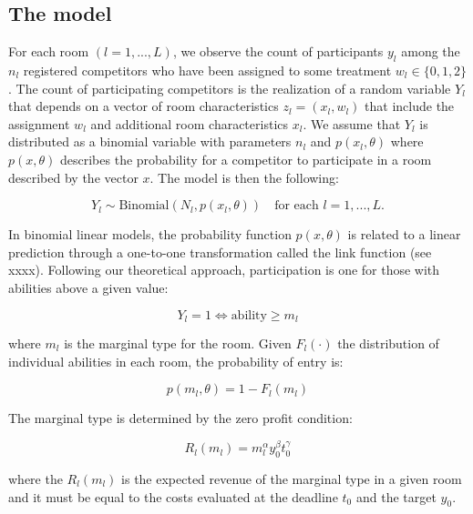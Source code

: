 \documentclass[]{article}
\begin{document}
\newcommand\target{}
\newcommand\deadline{}

\subsection{The model}\label{the-model}

For each room \((l=1, ..., L)\), we observe the count of participants
\(y_l\) among the \(n_l\) registered competitors who have been assigned
to some treatment \(w_l\in\{0, 1, 2\}\). The count of participating
competitors is the realization of a random variable \(Y_l\) that depends
on a vector of room characteristics \(z_l=(x_l, w_l)\) that include the
assignment \(w_l\) and additional room characteristics \(x_l\). We
assume that \(Y_l\) is distributed as a binomial variable with
parameters \(n_l\) and \(p(x_l, \theta)\) where \(p(x, \theta)\)
describes the probability for a competitor to participate in a room
described by the vector \(x\). The model is then the following:

\begin{equation}
    \label{model}
    Y_{l} \sim \text{Binomial}(N_l, p(x_l, \theta)) \quad \text{for each } l=1,...,L.
\end{equation}

In binomial linear models, the probability function \(p(x, \theta)\) is
related to a linear prediction through a one-to-one transformation
called the link function (see xxxx). Following our theoretical approach,
participation is one for those with abilities above a given value:

\[
    Y_{l} = 1 \iff  \text{ability}  \geq m_{l}
\]

where \(m_l\) is the marginal type for the room. Given \(F_l(\cdot)\)
the distribution of individual abilities in each room, the probability
of entry is:

\begin{equation} 
    p(m_l, \theta) = 1 - F_l(m_l)
\end{equation}

The marginal type is determined by the zero profit condition:

\begin{equation}
    \label{zero profit}
    R_l(m_l) = m_l^\alpha y_0^\beta t_0^\gamma
\end{equation}

where the \(R_l(m_l)\) is the expected revenue of the marginal type in a
given room and it must be equal to the costs evaluated at the deadline
\(t_0\) and the target \(y_0\).
\end{document}

